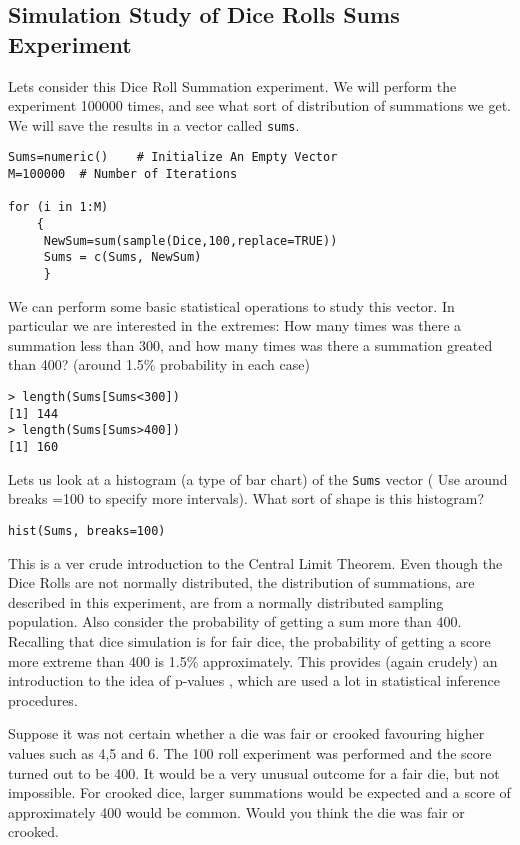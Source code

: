 \subsection{Simulation Study of Dice Rolls Sums Experiment}
Lets consider this Dice Roll Summation experiment. We will perform the experiment 100000 times, and see what sort of distribution of summations we get.
We will save the results in a vector called \texttt{sums}.
\begin{framed}
\begin{verbatim}
Sums=numeric()    # Initialize An Empty Vector
M=100000  # Number of Iterations

for (i in 1:M)
    {
     NewSum=sum(sample(Dice,100,replace=TRUE))
     Sums = c(Sums, NewSum)
     }
\end{verbatim}
\end{framed}

We can perform some basic statistical operations to study this vector. In particular we are interested in the extremes: How many times was there a summation less than 300, and how many times was there a summation greated than 400? (around 1.5\% probability in each case)

\begin{verbatim}
> length(Sums[Sums<300])
[1] 144
> length(Sums[Sums>400])
[1] 160  
\end{verbatim}

Lets us look at a histogram (a type of bar chart) of the \texttt{Sums} vector ( Use around breaks =100 to specify more intervals). What sort of shape is this histogram?
\begin{framed}
\begin{verbatim}
hist(Sums, breaks=100)
\end{verbatim}
\end{framed}

This is a ver crude introduction to the Central Limit Theorem. Even though the Dice Rolls are not normally distributed, the distribution of summations, are described in this experiment, are from a normally distributed sampling population. Also consider the probability of getting a sum more than 400. Recalling that dice simulation is for fair dice, the probability of getting a score more extreme than 400 is 1.5\% approximately. This provides (again crudely) an introduction to the idea of p-values , which are used a lot in statistical inference procedures. 

Suppose it was not certain whether a die was fair or crooked favouring higher values such as 4,5 and 6. The 100 roll experiment was performed and the score turned out to be 400.  It would be a very unusual outcome for a fair die, but not impossible. For crooked dice, larger summations would be expected and a score of approximately 400 would be common. Would you think the die was fair or crooked.

